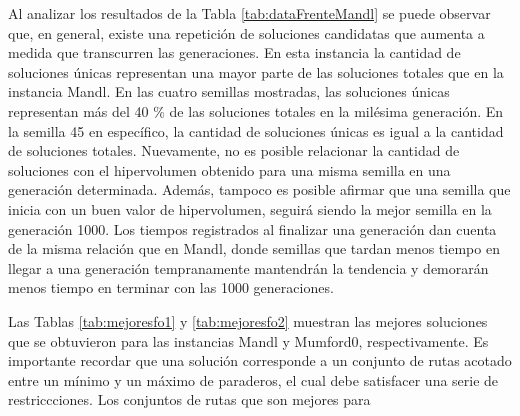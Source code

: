 Al analizar los resultados de la Tabla \ref{tab:dataFrenteMandl} se puede observar que, en general, existe una repetición de soluciones candidatas que aumenta a medida que transcurren las generaciones. En esta instancia la cantidad de soluciones únicas representan una mayor parte de las soluciones totales que en la instancia Mandl. En las cuatro semillas mostradas, las soluciones únicas representan más del 40 \% de las soluciones totales en la milésima generación. En la semilla 45 en específico, la cantidad de soluciones únicas es igual a la cantidad de soluciones totales. Nuevamente, no es posible relacionar la cantidad de soluciones con el hipervolumen obtenido para una misma semilla en una generación determinada. Además, tampoco es posible afirmar que una semilla que inicia con un buen valor de hipervolumen, seguirá siendo la mejor semilla en la generación 1000. Los tiempos registrados al finalizar una generación dan cuenta de la misma relación que en Mandl, donde semillas que tardan menos tiempo en llegar a una generación tempranamente mantendrán la tendencia y demorarán menos tiempo en terminar con las 1000 generaciones. 

Las Tablas \ref{tab:mejoresfo1} y \ref{tab:mejoresfo2} muestran las mejores soluciones que se obtuvieron para las instancias Mandl y Mumford0, respectivamente. Es importante recordar que una solución corresponde a un conjunto de rutas acotado entre un mínimo y un máximo de paraderos, el cual debe satisfacer una serie de restriccciones. Los conjuntos de rutas que son mejores para 


